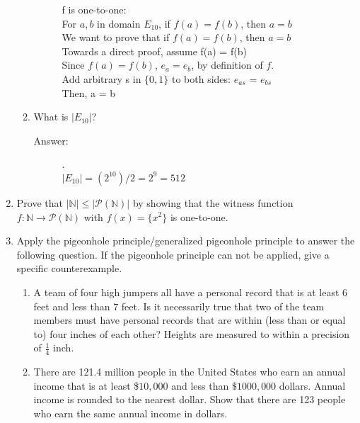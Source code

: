 \documentclass[12pt, oneside]{article}
\begin{document}
\begin{enumerate}
\begin{enumerate}
\begin{description}
        f is one-to-one:\\
        For $a,b$ in domain $E_{10}$, if $f(a) = f(b)$, then $a = b$\\
        We want to prove that if  $f(a) = f(b)$, then $a = b$\\
        Towards a direct proof, assume f(a) = f(b)\\
        Since $f(a) = f(b)$, $e_a = e_b$, by definition of $f$.\\
        Add arbitrary s in $\{0,1\}$ to both sides: $e_{as}$ = $e_{bs}$\\
        Then, a = b\\
    \end{description}
    \item What is $\vert E_{10}\vert$?
    \begin{description}
        \item[Answer:] .\\
        $|E_{10}| = (2^{10})/2 = 2^9 = 512$
    \end{description}
\end{enumerate}



\item Prove that $| \mathbb{N} | \leq |\mathcal{P} ( \mathbb{N} ) |$ by showing that the witness function $f:  \mathbb{N} \to\mathcal{P}(\mathbb{N}) $ with $f(x) = \{x^2\}$ is one-to-one.


\item Apply the pigeonhole principle/generalized pigeonhole principle to answer the following question. If the pigeonhole principle can not be applied, give a specific counterexample. 

\begin{enumerate}
    \item A team of four high jumpers all have a personal record that is at least $6$ feet and less than $7$ feet. Is it necessarily true that two of the team members must have personal records that are within (less than or equal to) four inches of each other?  Heights are measured to within a precision of $\frac{1}{4}$ inch. 
    \item There are 121.4 million people in the United States who earn an annual income that is at least \$$10,000$ and less than $\$1000,000$ dollars. Annual income is rounded to the nearest dollar. Show that there are 123 people who earn the same annual income in dollars.

\end{enumerate}




\end{enumerate}
\end{document}
